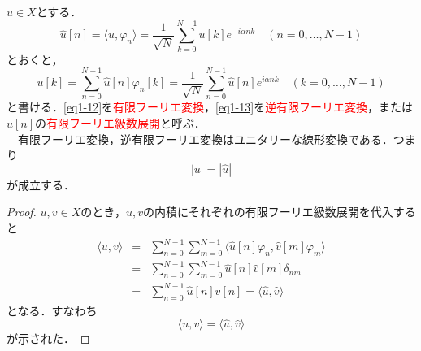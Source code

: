 \documentclass[a4j]{jsbook}
\numberwithin{theorem}{chapter}  %
\begin{document}
\(u\in X\)とする．
\begin{equation}
    \hat{u}[n]=\langle u, \varphi_n\rangle=\frac{1}{\sqrt{N}}\sum_{k=0}^{N-1}u[k]e^{-i\alpha nk}\quad (n=0, \dots, N-1) \label{eq1-12}
\end{equation}
とおくと，
\begin{equation}
    u[k]=\sum_{n=0}^{N-1}\hat{u}[n]\varphi_n[k]=\frac{1}{\sqrt{N}}\sum_{n=0}^{N-1}\hat{u}[n]e^{i\alpha nk}\quad (k=0, \dots, N-1) \label{eq1-13}
\end{equation}
と書ける．\eqref{eq1-12}を\textcolor{red}{有限フーリエ変換}，\eqref{eq1-13}を\textcolor{red}{逆有限フーリエ変換}，または\(\hat{u}[n]\)の\textcolor{red}{有限フーリエ級数展開}と呼ぶ．\\
　有限フーリエ変換，逆有限フーリエ変換はユニタリーな線形変換である．つまり
\begin{equation}
    |u|=|\hat{u}| \label{eq1-14}
\end{equation}
が成立する．
\begin{proof}
\(u, v\in X\)のとき，\(u, v\)の内積にそれぞれの有限フーリエ級数展開を代入すると
\begin{eqnarray*}
\langle u, v\rangle&=&\sum_{n=0}^{N-1}\sum_{m=0}^{N-1}\langle \hat{u}[n]\varphi_n, \hat{v}[m]\varphi_m\rangle \\
&=&\sum_{n=0}^{N-1}\sum_{m=0}^{N-1}\hat{u}[n]\overline{\hat{v}[m]}\delta_{nm} \\
&=&\sum_{n=0}^{N-1}\hat{u}[n]\overline{\hat{v}[n]}=\langle\hat{u}, \hat{v}\rangle
\end{eqnarray*}
となる．すなわち
\begin{equation}
    \langle u, v\rangle=\langle\hat{u}, \hat{v}\rangle \label{eq1-15}
\end{equation}
が示された．
\end{proof}
\end{document}
